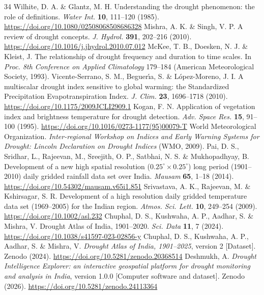 \documentclass[11pt,a4paper]{article}
\begin{document}
\begin{thebibliography}{34}
\small
{} Wilhite, D. A. \& Glantz, M. H. Understanding the drought phenomenon: the role of definitions. \textit{Water Int.} \textbf{10}, 111--120 (1985). \url{https://doi.org/10.1080/02508068508686328}
 Mishra, A. K. \& Singh, V. P. A review of drought concepts. \textit{J. Hydrol.} \textbf{391}, 202--216 (2010). \url{https://doi.org/10.1016/j.jhydrol.2010.07.012}
 McKee, T. B., Doesken, N. J. \& Kleist, J. The relationship of drought frequency and duration to time scales. In \textit{Proc. 8th Conference on Applied Climatology} 179--184 (American Meteorological Society, 1993).
 Vicente-Serrano, S. M., Beguer\'{\i}a, S. \& L\'{o}pez-Moreno, J. I. A multiscalar drought index sensitive to global warming: the Standardized Precipitation Evapotranspiration Index. \textit{J. Clim.} \textbf{23}, 1696--1718 (2010). \url{https://doi.org/10.1175/2009JCLI2909.1}
 Kogan, F. N. Application of vegetation index and brightness temperature for drought detection. \textit{Adv. Space Res.} \textbf{15}, 91--100 (1995). \url{https://doi.org/10.1016/0273-1177(95)00079-T}
 World Meteorological Organization. \textit{Inter-regional Workshop on Indices and Early Warning Systems for Drought: Lincoln Declaration on Drought Indices} (WMO, 2009).
 Pai, D. S., Sridhar, L., Rajeevan, M., Sreejith, O. P., Satbhai, N. S. \& Mukhopadhyay, B. Development of a new high spatial resolution ($0.25^\circ\times0.25^\circ$) long period (1901--2010) daily gridded rainfall data set over India. \textit{Mausam} \textbf{65}, 1--18 (2014). \url{https://doi.org/10.54302/mausam.v65i1.851}
 Srivastava, A. K., Rajeevan, M. \& Kshirsagar, S. R. Development of a high resolution daily gridded temperature data set (1969--2005) for the Indian region. \textit{Atmos. Sci. Lett.} \textbf{10}, 249--254 (2009). \url{https://doi.org/10.1002/asl.232}
 Chuphal, D. S., Kushwaha, A. P., Aadhar, S. \& Mishra, V. Drought Atlas of India, 1901--2020. \textit{Sci. Data} \textbf{11}, 7 (2024). \url{https://doi.org/10.1038/s41597-023-02856-y}
 Chuphal, D. S., Kushwaha, A. P., Aadhar, S. \& Mishra, V. \textit{Drought Atlas of India, 1901--2025}, version 2 [Dataset]. Zenodo (2024). \url{https://doi.org/10.5281/zenodo.20368514}
 Deshmukh, A. \textit{Drought Intelligence Explorer: an interactive geospatial platform for drought monitoring and analysis in India}, version 1.0.0 [Computer software and dataset]. Zenodo (2026). \url{https://doi.org/10.5281/zenodo.24113364}

\end{thebibliography}
\end{document}
